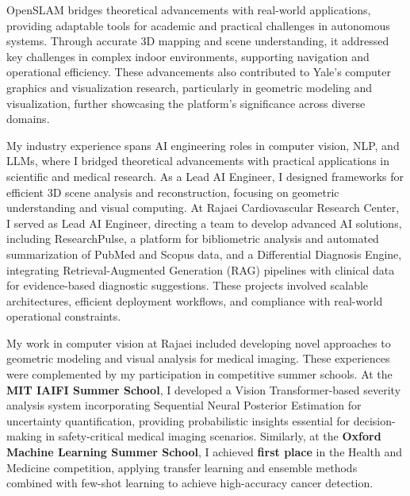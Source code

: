 \documentclass[a4,20pt]{article}
\begin{document}
\begin{large}
OpenSLAM bridges theoretical advancements with real-world applications, providing adaptable tools for academic and practical challenges in autonomous systems. Through accurate 3D mapping and scene understanding, it addressed key challenges in complex indoor environments, supporting navigation and operational efficiency. These advancements also contributed to Yale's computer graphics and visualization research, particularly in geometric modeling and visualization, further showcasing the platform's significance across diverse domains.



My industry experience spans AI engineering roles in computer vision, NLP, and LLMs, where I bridged theoretical advancements with practical applications in scientific and medical research. As a Lead AI Engineer, I designed frameworks for efficient 3D scene analysis and reconstruction, focusing on geometric understanding and visual computing. At Rajaei Cardiovascular Research Center, I served as Lead AI Engineer, directing a team to develop advanced AI solutions, including ResearchPulse, a platform for bibliometric analysis and automated summarization of PubMed and Scopus data, and a Differential Diagnosis Engine, integrating Retrieval-Augmented Generation (RAG) pipelines with clinical data for evidence-based diagnostic suggestions. These projects involved scalable architectures, efficient deployment workflows, and compliance with real-world operational constraints.

My work in computer vision at Rajaei included developing novel approaches to geometric modeling and visual analysis for medical imaging. These experiences were complemented by my participation in competitive summer schools. At the \textbf{MIT IAIFI Summer School}, I developed a Vision Transformer-based severity analysis system incorporating Sequential Neural Posterior Estimation for uncertainty quantification, providing probabilistic insights essential for decision-making in safety-critical medical imaging scenarios. Similarly, at the \textbf{Oxford Machine Learning Summer School}, I achieved \textbf{first place} in the Health and Medicine competition, applying transfer learning and ensemble methods combined with few-shot learning to achieve high-accuracy cancer detection.


\end{large}
\end{document}
